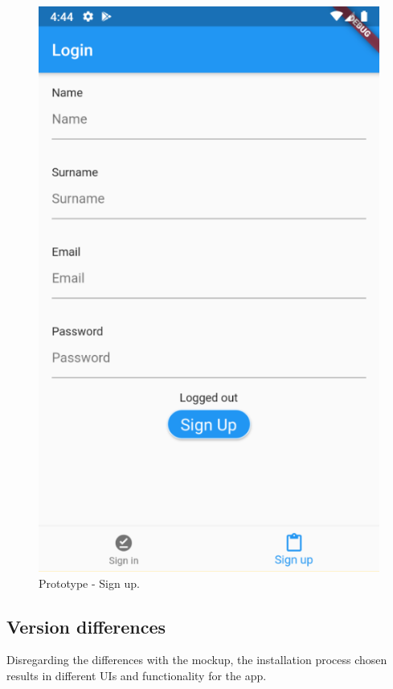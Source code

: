 \begin{figure}[H]
    \begin{minipage}{.422\textwidth}
        \centering
        \includegraphics[width=.8\textwidth]{Images/prototype-sign-up.png}
        \caption{\label{fig:prototype-sign-up}Prototype - Sign up.}
    \end{minipage}
    \end{figure}

\subsection{Version differences}
Disregarding the differences with the mockup, the installation process chosen results in different UIs and functionality for the app.

